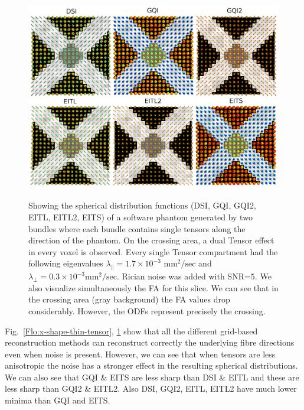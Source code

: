 \documentclass{bioinfo}
\begin{document}
%
\begin{figure}
[ht!]

\begin{centering}
\includegraphics[scale=0.14]{figures/software_phantom_comparisons_rician_05_fat}
\par\end{centering}

\caption{Showing the spherical distribution functions (DSI, GQI, GQI2, EITL,
EITL2, EITS) of a software phantom generated by two bundles where
each bundle contains single tensors along the direction of the phantom.
On the crossing area, a dual Tensor effect in every voxel is observed.
Every single Tensor compartment had the following eigenvalues $\lambda_{\parallel}=1.7\times10^{-3}$
\foreignlanguage{british}{$\textrm{mm}^{2}/\textrm{sec}$} and $\lambda_{\perp}=0.3\times10^{-3}\textrm{mm}^{2}/\textrm{sec}$.
Rician noise was added with SNR=$5$. We also visualize simultaneously
the FA for this slice. We can see that in the crossing area (gray
background) the FA values drop considerably. However, the ODFs represent
precisely the crossing. }


\centering{}\label{Flo:x-shape-fat-tensor}
\end{figure}


Fig.~\ref{Flo:x-shape-thin-tensor}, \ref{Flo:x-shape-fat-tensor}
show that all the different grid-based reconstruction methods can
reconstruct correctly the underlying fibre directions even when noise
is present. However, we can see that when tensors are less anisotropic
the noise has a stronger effect in the resulting spherical distributions.
We can also see that GQI \& EITS are less sharp than DSI \& EITL and
these are less sharp than GQI2 \& EITL2. Also DSI, GQI2, EITL, EITL2
have much lower minima than GQI and EITS. 
\end{document}
